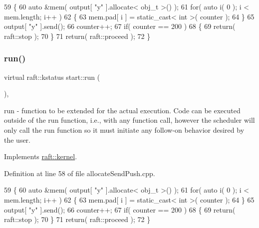 \begin{DoxyCode}
59     \{
60         \textcolor{keyword}{auto} &mem( output[ \textcolor{stringliteral}{"y"} ].allocate< obj\_t >() );
61         \textcolor{keywordflow}{for}( \textcolor{keyword}{auto} i( 0 ); i < mem.length; i++ )
62         \{
63             mem.pad[ i ] = \textcolor{keyword}{static\_cast<} \textcolor{keywordtype}{int} \textcolor{keyword}{>}( counter );
64         \}
65         output[ \textcolor{stringliteral}{"y"} ].send();
66         counter++;
67         \textcolor{keywordflow}{if}( counter == 200 )
68         \{
69             \textcolor{keywordflow}{return}( raft::stop );
70         \}
71         \textcolor{keywordflow}{return}( raft::proceed );
72     \}
\end{DoxyCode}
\hypertarget{classstart_a4c076d756e2846f51e54452853a9ed6d}{}\label{classstart_a4c076d756e2846f51e54452853a9ed6d} 
\subsubsection{\texorpdfstring{run()}{run()}\hspace{0.1cm}{\footnotesize\ttfamily [3/6]}}
{\footnotesize\ttfamily virtual raft\+::kstatus start\+::run (\begin{DoxyParamCaption}{ }\end{DoxyParamCaption})\hspace{0.3cm}{\ttfamily [inline]}, {\ttfamily [virtual]}}

run -\/ function to be extended for the actual execution. Code can be executed outside of the run function, i.\+e., with any function call, however the scheduler will only call the run function so it must initiate any follow-\/on behavior desired by the user. 

Implements \hyperlink{classraft_1_1kernel_a05094286d7577360fb1b91c91fc05901}{raft\+::kernel}.



Definition at line 58 of file allocate\+Send\+Push.\+cpp.


\begin{DoxyCode}
59     \{
60         \textcolor{keyword}{auto} &mem( output[ \textcolor{stringliteral}{"y"} ].allocate< obj\_t >() );
61         \textcolor{keywordflow}{for}( \textcolor{keyword}{auto} i( 0 ); i < mem.length; i++ )
62         \{
63             mem.pad[ i ] = \textcolor{keyword}{static\_cast<} \textcolor{keywordtype}{int} \textcolor{keyword}{>}( counter );
64         \}
65         output[ \textcolor{stringliteral}{"y"} ].send();
66         counter++;
67         \textcolor{keywordflow}{if}( counter == 200 )
68         \{
69             \textcolor{keywordflow}{return}( raft::stop );
70         \}
71         \textcolor{keywordflow}{return}( raft::proceed );
72     \}
\end{DoxyCode}
\hypertarget{classstart_a4c076d756e2846f51e54452853a9ed6d}{}\label{classstart_a4c076d756e2846f51e54452853a9ed6d} 
